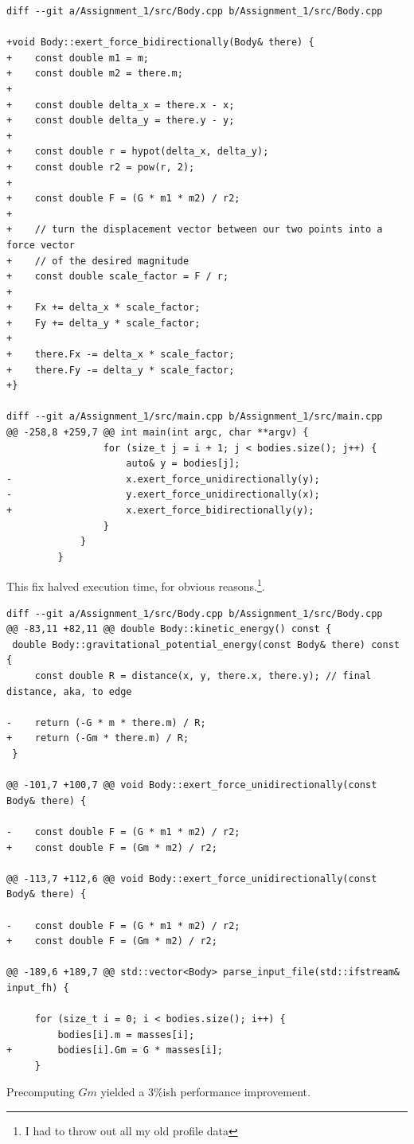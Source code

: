 \documentclass[11pt,a4paper]{article}
\begin{document}
\begin{verbatim}
diff --git a/Assignment_1/src/Body.cpp b/Assignment_1/src/Body.cpp

+void Body::exert_force_bidirectionally(Body& there) {
+    const double m1 = m;
+    const double m2 = there.m;
+
+    const double delta_x = there.x - x;
+    const double delta_y = there.y - y;
+
+    const double r = hypot(delta_x, delta_y);
+    const double r2 = pow(r, 2);
+
+    const double F = (G * m1 * m2) / r2;
+
+    // turn the displacement vector between our two points into a force vector
+    // of the desired magnitude
+    const double scale_factor = F / r;
+
+    Fx += delta_x * scale_factor;
+    Fy += delta_y * scale_factor;
+
+    there.Fx -= delta_x * scale_factor;
+    there.Fy -= delta_y * scale_factor;
+}

diff --git a/Assignment_1/src/main.cpp b/Assignment_1/src/main.cpp
@@ -258,8 +259,7 @@ int main(int argc, char **argv) {
                 for (size_t j = i + 1; j < bodies.size(); j++) {
                     auto& y = bodies[j];
-                    x.exert_force_unidirectionally(y);
-                    y.exert_force_unidirectionally(x);
+                    x.exert_force_bidirectionally(y);
                 }
             }
         }
\end{verbatim}

This fix halved execution time, for obvious reasons.\footnote{I had to throw out all my old profile data}.

\begin{verbatim}
diff --git a/Assignment_1/src/Body.cpp b/Assignment_1/src/Body.cpp
@@ -83,11 +82,11 @@ double Body::kinetic_energy() const {
 double Body::gravitational_potential_energy(const Body& there) const {
     const double R = distance(x, y, there.x, there.y); // final distance, aka, to edge

-    return (-G * m * there.m) / R;
+    return (-Gm * there.m) / R;
 }

@@ -101,7 +100,7 @@ void Body::exert_force_unidirectionally(const Body& there) {

-    const double F = (G * m1 * m2) / r2;
+    const double F = (Gm * m2) / r2;

@@ -113,7 +112,6 @@ void Body::exert_force_unidirectionally(const Body& there) {

-    const double F = (G * m1 * m2) / r2;
+    const double F = (Gm * m2) / r2;

@@ -189,6 +189,7 @@ std::vector<Body> parse_input_file(std::ifstream& input_fh) {

     for (size_t i = 0; i < bodies.size(); i++) {
         bodies[i].m = masses[i];
+        bodies[i].Gm = G * masses[i];
     }

\end{verbatim}

Precomputing $Gm$ yielded a 3\%ish performance improvement.

\medskip
 


\end{document}
